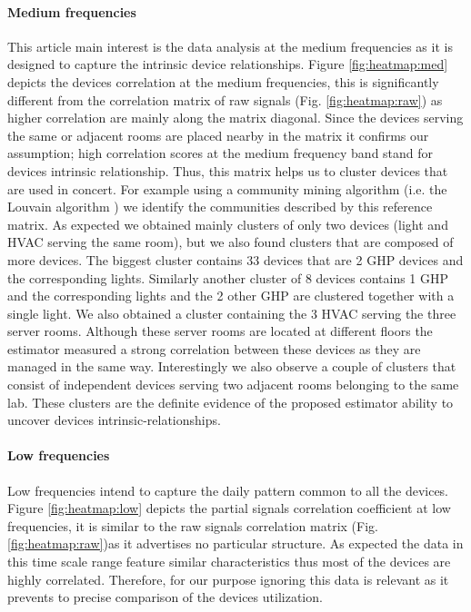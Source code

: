 \paragraph{Medium frequencies}
This article main interest is the data analysis at the medium frequencies as it is designed to capture the intrinsic device relationships.
Figure \ref{fig:heatmap:med} depicts the devices correlation at the medium frequencies, this is significantly different from the correlation matrix of raw signals (Fig. \ref{fig:heatmap:raw}) as higher correlation are mainly along the matrix diagonal. 
Since the devices serving the same or adjacent rooms are placed nearby in the matrix it confirms our assumption; high correlation scores at the medium frequency band stand for devices intrinsic relationship.
Thus, this matrix helps us to cluster devices that are used in concert.
For example using a community mining algorithm (i.e. the Louvain algorithm \cite{blondel:unfolding}) we identify the communities described by this reference matrix.
As expected we obtained mainly clusters of only two devices (light and HVAC serving the same room), but we also found clusters that are composed of more devices.
The biggest cluster contains 33 devices that are 2 GHP devices and the corresponding lights.
Similarly another cluster of 8 devices contains 1 GHP and the corresponding lights and the 2 other GHP are clustered together with a single light.
We also obtained a cluster containing the 3 HVAC serving the three server rooms. Although these server rooms are located at different floors the estimator measured a strong correlation between these devices as they are managed in the same way.
Interestingly we also observe a couple of clusters that consist of independent devices serving two adjacent rooms belonging to the same lab.
These clusters are the definite evidence of the proposed estimator ability to uncover devices intrinsic-relationships.
 
\paragraph{Low frequencies}
Low frequencies intend to capture the daily pattern common to all the devices.
Figure \ref{fig:heatmap:low} depicts the partial signals correlation coefficient at low frequencies, it is similar to the raw signals correlation matrix (Fig. \ref{fig:heatmap:raw})as it advertises no particular structure.
As expected the data in this time scale range feature similar characteristics thus most of the devices are highly correlated.
Therefore, for our purpose ignoring this data is relevant as it prevents to precise comparison of the devices utilization.
 
